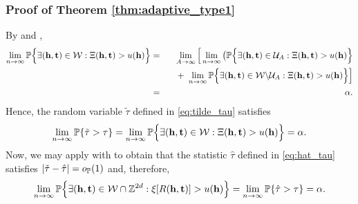 \documentclass[twoside,11pt]{article}
\begin{document}
\subsubsection{Proof of Theorem \ref{thm:adaptive_type1}}
By  and , 
\begin{eqnarray}
\lim_{n \rightarrow \infty} \mathbb{P} \Big\{ \exists (\mathbf{h},\mathbf{t}) \in \mathcal{W} : \Xi(\mathbf{h}, \mathbf{t}) > u(\mathbf{h}) \Big\} 
&=& \lim_{A \rightarrow \infty} \Big[ \lim_{n \rightarrow \infty} \big( \mathbb{P} \Big\{ \exists (\mathbf{h},\mathbf{t}) \in \mathcal{U}_A : \Xi(\mathbf{h},\mathbf{t}) > u(\mathbf{h}) \Big\} \notag \\
&&\quad +\ \lim_{n \rightarrow \infty} \mathbb{P} \Big\{ \exists (\mathbf{h},\mathbf{t}) \in \mathcal{W} \backslash \mathcal{U}_A : \Xi(\mathbf{h},\mathbf{t}) > u(\mathbf{h}) \Big\} \Big] \notag \\
&=& \alpha. \label{W_alpha}
\end{eqnarray}
Hence, the random variable $\tilde \tau$ defined in \eqref{eq:tilde_tau} satisfies
\[
\lim_{n \rightarrow \infty} \mathbb{P} \{ \tilde \tau > \tau \} = \lim_{n \rightarrow \infty} \mathbb{P} \Big\{ \exists (\mathbf{h},\mathbf{t}) \in \mathcal{W} : \Xi(\mathbf{h}, \mathbf{t}) > u(\mathbf{h}) \Big\} = \alpha.
\]
Now, we may apply  with  to obtain that the statistic $\hat \tau$ defined in \eqref{eq:hat_tau} satisfies $|\tilde \tau - \hat \tau| = o_{\mathbb{P}}(1)$ and, therefore,
\[
\lim_{n \rightarrow \infty} \mathbb{P} \Big\{ \exists (\mathbf{h},\mathbf{t}) \in \mathcal{W} \cap \mathbb{Z}^{2d} : \xi[R(\mathbf{h}, \mathbf{t})] > u(\mathbf{h}) \Big\} = \lim_{n \rightarrow \infty} \mathbb{P} \{ \hat \tau > \tau \} = \alpha.
\]
\end{document}
